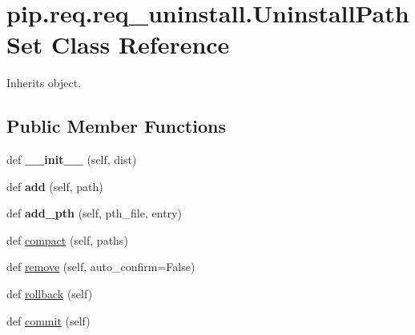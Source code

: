 \hypertarget{classpip_1_1req_1_1req__uninstall_1_1_uninstall_path_set}{}\section{pip.\+req.\+req\+\_\+uninstall.\+Uninstall\+Path\+Set Class Reference}
\label{classpip_1_1req_1_1req__uninstall_1_1_uninstall_path_set}


Inherits object.

\subsection*{Public Member Functions}
\begin{DoxyCompactItemize}
\item 
\mbox{\label{classpip_1_1req_1_1req__uninstall_1_1_uninstall_path_set_a9875997c6e86b1c934b5860ff0195266}} 
def {\bfseries \+\_\+\+\_\+init\+\_\+\+\_\+} (self, dist)
\item 
\mbox{\label{classpip_1_1req_1_1req__uninstall_1_1_uninstall_path_set_a5dc9701f07416fc0a0339298644ab9b9}} 
def {\bfseries add} (self, path)
\item 
\mbox{\label{classpip_1_1req_1_1req__uninstall_1_1_uninstall_path_set_a4e0c9effe7b1b3ecc727d9fec06ee25a}} 
def {\bfseries add\+\_\+pth} (self, pth\+\_\+file, entry)
\item 
def \hyperlink{classpip_1_1req_1_1req__uninstall_1_1_uninstall_path_set_a25323acc546b28ca2a8ee8719c733c3d}{compact} (self, paths)
\item 
def \hyperlink{classpip_1_1req_1_1req__uninstall_1_1_uninstall_path_set_af085c6d453dc2e63a6f1752239a91a0f}{remove} (self, auto\+\_\+confirm=False)
\item 
def \hyperlink{classpip_1_1req_1_1req__uninstall_1_1_uninstall_path_set_a127cedc2e28d75e6e66e240e7be39500}{rollback} (self)
\item 
def \hyperlink{classpip_1_1req_1_1req__uninstall_1_1_uninstall_path_set_a73103147982dceec014e66072c4cf611}{commit} (self)
\end{DoxyCompactItemize}
